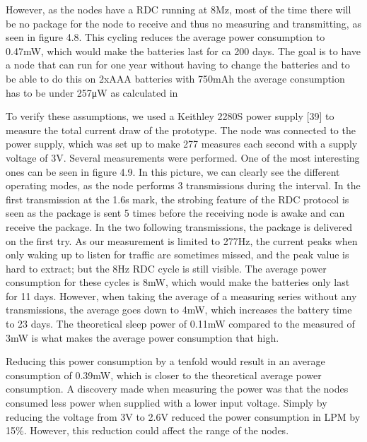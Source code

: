 However,
	as the nodes have a RDC running at 8Mz,
	most of the time there will be no package for the node to receive and thus no measuring and transmitting,
	as seen in figure 4.8.
This cycling reduces the average power consumption to 0.47mW,
	which would make the batteries last for ca 200 days.
The goal is to have a node that can run for one year without having to change the batteries and to be able to do this on 2xAAA batteries with 750mAh the average consumption has to be under 257μW as calculated in 

To verify these assumptions,
	we used a Keithley 2280S power supply [39] to measure the total current draw of the prototype.
The node was connected to the power supply,
	which was set up to make 277 measures each second with a supply voltage of 3V.
Several measurements were performed.
One of the most interesting ones can be seen in figure 4.9.
In this picture,
	we can clearly see the different operating modes,
	as the node performs 3 transmissions during the interval.
In the first transmission at the 1.6s mark,
	the strobing feature of the RDC protocol is seen as the package is sent 5 times before the receiving node is awake and can receive the package.
In the two following transmissions,
	the package is delivered on the first try.
As our measurement is limited to 277Hz,
	the current peaks when only waking up to listen for traffic are sometimes missed,
	and the peak value is hard to extract;
	but the 8Hz RDC cycle is still visible.
The average power consumption for these cycles is 8mW,
	which would make the batteries only last for 11 days.
However,
	when taking the average of a measuring series without any transmissions,
	the average goes down to 4mW,
	which increases the battery time to 23 days.
The theoretical sleep power of 0.11mW compared to the measured of 3mW is what makes the average power consumption that high.

Reducing this power consumption by a tenfold would result in an average consumption of 0.39mW,
	which is closer to the theoretical average power consumption.
A discovery made when measuring the power was that the nodes consumed less power when supplied with a lower input voltage.
Simply by reducing the voltage from 3V to 2.6V reduced the power consumption in LPM by 15\%.
However,
	this reduction could affect the range of the nodes.










